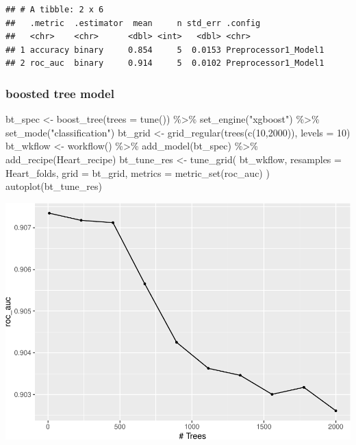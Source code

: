 \documentclass[
]{article}
\newenvironment{Shaded}{\begin{snugshade}}{\end{snugshade}}
\newcommand{\AttributeTok}[1]{\textcolor[rgb]{0.77,0.63,0.00}{#1}}
\newcommand{\DecValTok}[1]{\textcolor[rgb]{0.00,0.00,0.81}{#1}}
\newcommand{\FunctionTok}[1]{\textcolor[rgb]{0.00,0.00,0.00}{#1}}
\newcommand{\NormalTok}[1]{#1}
\newcommand{\OtherTok}[1]{\textcolor[rgb]{0.56,0.35,0.01}{#1}}
\newcommand{\SpecialCharTok}[1]{\textcolor[rgb]{0.00,0.00,0.00}{#1}}
\newcommand{\StringTok}[1]{\textcolor[rgb]{0.31,0.60,0.02}{#1}}
\begin{document}
\begin{verbatim}
## # A tibble: 2 x 6
##   .metric  .estimator  mean     n std_err .config             
##   <chr>    <chr>      <dbl> <int>   <dbl> <chr>               
## 1 accuracy binary     0.854     5  0.0153 Preprocessor1_Model1
## 2 roc_auc  binary     0.914     5  0.0102 Preprocessor1_Model1
\end{verbatim}

\hypertarget{boosted-tree-model}{%
\subsubsection{boosted tree model}\label{boosted-tree-model}}

\begin{Shaded}
\begin{Highlighting}[]
\NormalTok{bt\_spec }\OtherTok{\textless{}{-}} \FunctionTok{boost\_tree}\NormalTok{(}\AttributeTok{trees =} \FunctionTok{tune}\NormalTok{()) }\SpecialCharTok{\%\textgreater{}\%}
  \FunctionTok{set\_engine}\NormalTok{(}\StringTok{"xgboost"}\NormalTok{) }\SpecialCharTok{\%\textgreater{}\%}
  \FunctionTok{set\_mode}\NormalTok{(}\StringTok{"classification"}\NormalTok{)}
\NormalTok{bt\_grid }\OtherTok{\textless{}{-}} \FunctionTok{grid\_regular}\NormalTok{(}\FunctionTok{trees}\NormalTok{(}\FunctionTok{c}\NormalTok{(}\DecValTok{10}\NormalTok{,}\DecValTok{2000}\NormalTok{)), }\AttributeTok{levels =} \DecValTok{10}\NormalTok{)}
\NormalTok{bt\_wkflow }\OtherTok{\textless{}{-}} \FunctionTok{workflow}\NormalTok{() }\SpecialCharTok{\%\textgreater{}\%}
  \FunctionTok{add\_model}\NormalTok{(bt\_spec) }\SpecialCharTok{\%\textgreater{}\%}
    \FunctionTok{add\_recipe}\NormalTok{(Heart\_recipe)}
\NormalTok{bt\_tune\_res }\OtherTok{\textless{}{-}} \FunctionTok{tune\_grid}\NormalTok{(}
\NormalTok{  bt\_wkflow,}
  \AttributeTok{resamples =}\NormalTok{ Heart\_folds,}
  \AttributeTok{grid =}\NormalTok{ bt\_grid,}
  \AttributeTok{metrics =} \FunctionTok{metric\_set}\NormalTok{(roc\_auc)}
\NormalTok{)}
\FunctionTok{autoplot}\NormalTok{(bt\_tune\_res)}
\end{Highlighting}
\end{Shaded}

\includegraphics{PSTAT-131--FINAL-PROJECT-_YIFAN-XU_files/figure-latex/unnamed-chunk-31-1.pdf}
\end{document}
